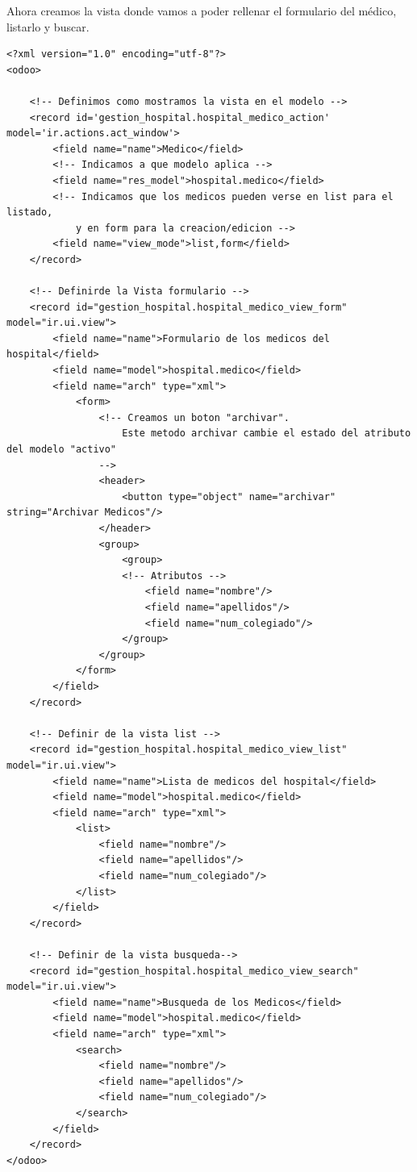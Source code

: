 \documentclass[a4paper,12pt]{article}
\begin{document}
Ahora creamos la vista donde vamos a poder rellenar el formulario del médico, listarlo y buscar. 

\vspace{0.5cm}
\begin{lstlisting}[style=javascript]
<?xml version="1.0" encoding="utf-8"?>
<odoo>

    <!-- Definimos como mostramos la vista en el modelo -->
    <record id='gestion_hospital.hospital_medico_action' model='ir.actions.act_window'>
        <field name="name">Medico</field>
        <!-- Indicamos a que modelo aplica -->
        <field name="res_model">hospital.medico</field>
        <!-- Indicamos que los medicos pueden verse en list para el listado,
            y en form para la creacion/edicion -->
        <field name="view_mode">list,form</field>
    </record>

    <!-- Definirde la Vista formulario -->
    <record id="gestion_hospital.hospital_medico_view_form" model="ir.ui.view">
        <field name="name">Formulario de los medicos del hospital</field>
        <field name="model">hospital.medico</field>
        <field name="arch" type="xml">
            <form>
                <!-- Creamos un boton "archivar". 
                    Este metodo archivar cambie el estado del atributo del modelo "activo"
                -->
                <header>
                    <button type="object" name="archivar" string="Archivar Medicos"/>
                </header>
                <group>
                    <group>
                    <!-- Atributos -->
                        <field name="nombre"/>
                        <field name="apellidos"/>
                        <field name="num_colegiado"/>
                    </group>
                </group>
            </form>
        </field>
    </record>

    <!-- Definir de la vista list -->
    <record id="gestion_hospital.hospital_medico_view_list" model="ir.ui.view">
        <field name="name">Lista de medicos del hospital</field>
        <field name="model">hospital.medico</field>
        <field name="arch" type="xml">
            <list>
                <field name="nombre"/>
                <field name="apellidos"/>                        
                <field name="num_colegiado"/>
            </list>
        </field>
    </record>

    <!-- Definir de la vista busqueda-->
    <record id="gestion_hospital.hospital_medico_view_search" model="ir.ui.view">
        <field name="name">Busqueda de los Medicos</field>
        <field name="model">hospital.medico</field>
        <field name="arch" type="xml">
            <search>
                <field name="nombre"/>
                <field name="apellidos"/>
                <field name="num_colegiado"/>
            </search>
        </field>
    </record>
</odoo>
\end{lstlisting}
\end{document}
